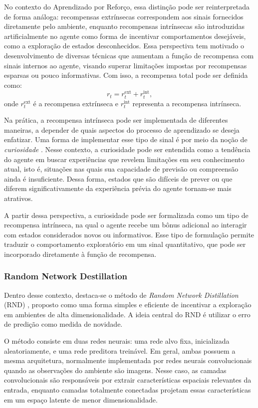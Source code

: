 No contexto do Aprendizado por Reforço, essa distinção pode ser reinterpretada de forma análoga: recompensas extrínsecas correspondem aos sinais fornecidos diretamente pelo ambiente, enquanto recompensas intrínsecas são introduzidas artificialmente no agente como forma de incentivar comportamentos desejáveis, como a exploração de estados desconhecidos. Essa perspectiva tem motivado o desenvolvimento de diversas técnicas que aumentam a função de recompensa com sinais internos ao agente, visando superar limitações impostas por recompensas esparsas ou pouco informativas. Com isso, a recompensa total pode ser definida como:
$$ 
r_t = r_t^{\text{ext}} + r_t^{\text{int}},
$$
onde $r_t^{\text{ext}}$ é a recompensa extrínseca e $r_t^{\text{int}}$ representa a recompensa intrínseca. 

Na prática, a recompensa intrínseca pode ser implementada de diferentes maneiras, a depender de quais aspectos do processo de aprendizado se deseja enfatizar. Uma forma de implementar esse tipo de sinal é por meio da noção de \textit{curiosidade} \cite{icm}. Nesse contexto, a curiosidade pode ser entendida como a tendência do agente em buscar experiências que revelem limitações em seu conhecimento atual, isto é, situações nas quais sua capacidade de previsão ou compreensão ainda é insuficiente. Dessa forma, estados que são difíceis de prever ou que diferem significativamente da experiência prévia do agente tornam-se mais atrativos.

A partir dessa perspectiva, a curiosidade pode ser formalizada como um tipo de recompensa intrínseca, na qual o agente recebe um bônus adicional ao interagir com estados considerados novos ou informativos. Esse tipo de formulação permite traduzir o comportamento exploratório em um sinal quantitativo, que pode ser incorporado diretamente à função de recompensa.

\subsubsection{ Random Network Destillation}
\label{subsubsec:rnd}

Dentro desse contexto, destaca-se o método de \textit{Random Network Distillation} (RND) \cite{rnd}, proposto como uma forma simples e eficiente de incentivar a exploração em ambientes de alta dimensionalidade. A ideia central do RND é utilizar o erro de predição como medida de novidade.

O método consiste em duas redes neurais: uma rede alvo fixa, inicializada aleatoriamente, e uma rede preditora treinável. Em geral, ambas possuem a mesma arquitetura, normalmente implementada por redes neurais convolucionais quando as observações do ambiente são imagens. Nesse caso, as camadas convolucionais são responsáveis por extrair características espaciais relevantes da entrada, enquanto camadas totalmente conectadas projetam essas características em um espaço latente de menor dimensionalidade.

